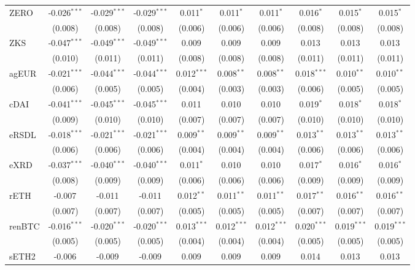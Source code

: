 \begin{table}[!htbp]
\begin{tabular}{@{\extracolsep{5pt}}lccccccccc}
 ZERO & -0.026$^{***}$ & -0.029$^{***}$ & -0.029$^{***}$ & 0.011$^{*}$ & 0.011$^{*}$ & 0.011$^{*}$ & 0.016$^{*}$ & 0.015$^{*}$ & 0.015$^{*}$ \\
  & (0.008) & (0.008) & (0.008) & (0.006) & (0.006) & (0.006) & (0.008) & (0.008) & (0.008) \\
 ZKS & -0.047$^{***}$ & -0.049$^{***}$ & -0.049$^{***}$ & 0.009$^{}$ & 0.009$^{}$ & 0.009$^{}$ & 0.013$^{}$ & 0.013$^{}$ & 0.013$^{}$ \\
  & (0.010) & (0.011) & (0.011) & (0.008) & (0.008) & (0.008) & (0.011) & (0.011) & (0.011) \\
 agEUR & -0.021$^{***}$ & -0.044$^{***}$ & -0.044$^{***}$ & 0.012$^{***}$ & 0.008$^{**}$ & 0.008$^{**}$ & 0.018$^{***}$ & 0.010$^{**}$ & 0.010$^{**}$ \\
  & (0.006) & (0.005) & (0.005) & (0.004) & (0.003) & (0.003) & (0.006) & (0.005) & (0.005) \\
 cDAI & -0.041$^{***}$ & -0.045$^{***}$ & -0.045$^{***}$ & 0.011$^{}$ & 0.010$^{}$ & 0.010$^{}$ & 0.019$^{*}$ & 0.018$^{*}$ & 0.018$^{*}$ \\
  & (0.009) & (0.010) & (0.010) & (0.007) & (0.007) & (0.007) & (0.010) & (0.010) & (0.010) \\
 eRSDL & -0.018$^{***}$ & -0.021$^{***}$ & -0.021$^{***}$ & 0.009$^{**}$ & 0.009$^{**}$ & 0.009$^{**}$ & 0.013$^{**}$ & 0.013$^{**}$ & 0.013$^{**}$ \\
  & (0.006) & (0.006) & (0.006) & (0.004) & (0.004) & (0.004) & (0.006) & (0.006) & (0.006) \\
 eXRD & -0.037$^{***}$ & -0.040$^{***}$ & -0.040$^{***}$ & 0.011$^{*}$ & 0.010$^{}$ & 0.010$^{}$ & 0.017$^{*}$ & 0.016$^{*}$ & 0.016$^{*}$ \\
  & (0.008) & (0.009) & (0.009) & (0.006) & (0.006) & (0.006) & (0.009) & (0.009) & (0.009) \\
 rETH & -0.007$^{}$ & -0.011$^{}$ & -0.011$^{}$ & 0.012$^{**}$ & 0.011$^{**}$ & 0.011$^{**}$ & 0.017$^{**}$ & 0.016$^{**}$ & 0.016$^{**}$ \\
  & (0.007) & (0.007) & (0.007) & (0.005) & (0.005) & (0.005) & (0.007) & (0.007) & (0.007) \\
 renBTC & -0.016$^{***}$ & -0.020$^{***}$ & -0.020$^{***}$ & 0.013$^{***}$ & 0.012$^{***}$ & 0.012$^{***}$ & 0.020$^{***}$ & 0.019$^{***}$ & 0.019$^{***}$ \\
  & (0.005) & (0.005) & (0.005) & (0.004) & (0.004) & (0.004) & (0.005) & (0.005) & (0.005) \\
 sETH2 & -0.006$^{}$ & -0.009$^{}$ & -0.009$^{}$ & 0.009$^{}$ & 0.009$^{}$ & 0.009$^{}$ & 0.014$^{}$ & 0.013$^{}$ & 0.013$^{}$ \\

\end{tabular}
\end{table}
